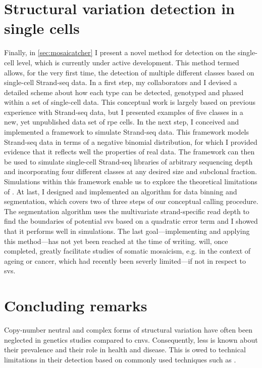 \section{Structural variation detection in single cells}

Finally, in \cref{sec:mosaicatcher} I present a novel method for \sv detection on
the single-cell level, which is currently under active development. This method
termed \mc allows, for the very first time, the detection of
multiple different \sv classes based on single-cell Strand-seq data. In a first
step, my collaborators and I devised a detailed scheme about how each \sv type
can be detected, genotyped and phased within a set of single-cell data. This
conceptual work is largely based on previous experience with Strand-seq data,
but I presented examples of five \sv classes in a new, yet
unpublished data set of \acl{rpe} cells. In the next step, I conceived and
implemented a framework to simulate Strand-seq data. This framework models
Strand-seq data in terms of a negative binomial distribution, for which I
provided evidence that it reflects well the properties of real data. The
framework can then be used to simulate single-cell Strand-seq libraries of
arbitrary sequencing depth and incorporating four
different \sv classes at any desired size and subclonal fraction. Simulations
within this framework enable us to explore the theoretical limitations of
\mc. At last, I designed and implemented an algorithm for data binning
and segmentation, which covers two of three steps of our conceptual \sv calling
procedure. The segmentation algorithm uses the multivariate strand-specific read
depth to find the boundaries of potential \acp{sv} based on a quadratic error
term and I showed that it performs well in
simulations. The last goal---implementing and applying this method---has not yet
been reached at the time of writing. \mc will, once completed, greatly
facilitate studies of somatic mosaicism, e.g. in the context of ageing or cancer,
which had recently been severly limited---if not in respect to \acp{sv}.




\section{Concluding remarks}
Copy-number neutral and complex forms of structural variation have often been
neglected in genetics studies compared to \acp{cnv}. Consequently, less is known
about their prevalence and their role in health and disease. This is owed to
technical limitations in their detection based on commonly used techniques
such as \mps.

